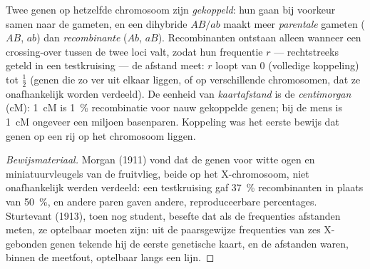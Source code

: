 \begin{definition}\label{def:b2:meiosis-heredity:linkage}
Twee genen op hetzelfde chromosoom zijn \emph{gekoppeld}: hun 
gaan bij voorkeur samen naar de gameten, en een dihybride
$AB/ab$ maakt meer \emph{parentale} gameten ($AB$, $ab$) dan
\emph{recombinante} ($Ab$, $aB$). Recombinanten ontstaan alleen wanneer
een crossing-over tussen de twee loci valt, zodat hun frequentie $r$ ---
rechtstreeks geteld in een testkruising --- de afstand meet: $r$
loopt van 0 (volledige koppeling) tot $\tfrac12$ (genen die zo ver uit
elkaar liggen, of op verschillende chromosomen, dat ze onafhankelijk
worden verdeeld). De eenheid van \emph{kaartafstand} is de
\emph{centimorgan} (cM): \qty{1}{cM}
is \qty{1}{\%} recombinatie voor nauw gekoppelde genen; bij de mens
is \qty{1}{cM} ongeveer een miljoen basenparen. Koppeling was het eerste
bewijs dat genen op een rij op het chromosoom liggen.
\end{definition}
\begin{proof}[Bewijsmateriaal]
Morgan (1911) vond dat de genen voor witte ogen en miniatuurvleugels van
de fruitvlieg, beide op het X-chromosoom, niet onafhankelijk werden
verdeeld: een testkruising gaf \qty{37}{\%} recombinanten in plaats van
\qty{50}{\%}, en andere paren gaven andere, reproduceerbare percentages.
Sturtevant (1913), toen nog student, besefte dat als de frequenties
afstanden meten, ze optelbaar moeten zijn: uit de paarsgewijze
frequenties van zes X-gebonden genen tekende hij de eerste genetische
kaart, en de afstanden waren, binnen de meetfout, optelbaar langs een lijn.
\end{proof}

